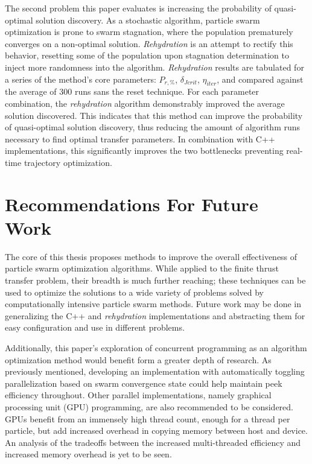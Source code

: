 \noindent The second problem this paper evaluates is increasing the probability of quasi-optimal solution 
discovery. As a stochastic algorithm, particle swarm optimization is prone to swarm stagnation, where the 
population prematurely converges on a non-optimal solution. \textit{Rehydration} is an attempt 
to rectify this behavior, resetting some of the population upon stagnation determination to inject more randomness
into the algorithm. \textit{Rehydration} results are tabulated for a series of the method's core parameters: $P_{r,\%}$,
$\delta_{Jcrit}$, $\eta_{iter}$, and compared against the average of 300 runs sans the reset technique. For each 
parameter combination, the \textit{rehydration} algorithm demonstrably improved the average solution discovered.
This indicates that this method can improve the probability of quasi-optimal solution discovery, thus reducing the 
amount of algorithm runs necessary to find optimal transfer parameters. In combination with C++ implementations, this significantly 
improves the two bottlenecks preventing real-time trajectory optimization.

\section{Recommendations For Future Work}

\noindent The core of this thesis proposes methods to improve the overall effectiveness of particle swarm 
optimization algorithms. While applied to the finite thrust transfer problem, their breadth is much further
reaching; these techniques can be used to optimize the solutions to a
wide variety of problems solved by computationally intensive particle swarm methods. Future work may be done in 
generalizing the C++ and \textit{rehydration} implementations and abstracting them for easy configuration and use 
in different problems. \newline

\noindent Additionally, this paper's exploration of concurrent programming as an algorithm optimization method
would benefit form a greater depth of research. As previously mentioned, developing an implementation with automatically
toggling parallelization based on swarm convergence state could help maintain peek efficiency throughout.
Other parallel implementations, namely graphical processing unit (GPU) programming, are also recommended to be considered. 
GPUs benefit from an immensely high thread count, enough for a thread per particle, but add increased overhead in copying
memory between host and device. An analysis of the tradeoffs between the increased multi-threaded efficiency and 
increased memory overhead is yet to be seen.

\newpage